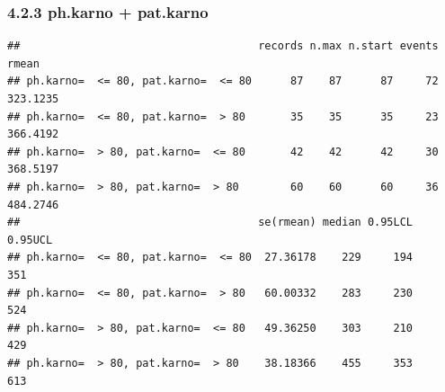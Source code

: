 \documentclass[
]{article}
\newenvironment{Shaded}{\begin{snugshade}}{\end{snugshade}}
\newcommand{\AttributeTok}[1]{\textcolor[rgb]{0.77,0.63,0.00}{#1}}
\newcommand{\CommentTok}[1]{\textcolor[rgb]{0.56,0.35,0.01}{\textit{#1}}}
\newcommand{\DecValTok}[1]{\textcolor[rgb]{0.00,0.00,0.81}{#1}}
\newcommand{\FunctionTok}[1]{\textcolor[rgb]{0.00,0.00,0.00}{#1}}
\newcommand{\NormalTok}[1]{#1}
\newcommand{\OtherTok}[1]{\textcolor[rgb]{0.56,0.35,0.01}{#1}}
\newcommand{\SpecialCharTok}[1]{\textcolor[rgb]{0.00,0.00,0.00}{#1}}
\newcommand{\StringTok}[1]{\textcolor[rgb]{0.31,0.60,0.02}{#1}}
\begin{document}
\hypertarget{ph.karno-pat.karno}{%
\subsubsection{4.2.3 ph.karno + pat.karno}\label{ph.karno-pat.karno}}

\begin{Shaded}
\end{Shaded}

\begin{verbatim}
##                                     records n.max n.start events    rmean
## ph.karno=  <= 80, pat.karno=  <= 80      87    87      87     72 323.1235
## ph.karno=  <= 80, pat.karno=  > 80       35    35      35     23 366.4192
## ph.karno=  > 80, pat.karno=  <= 80       42    42      42     30 368.5197
## ph.karno=  > 80, pat.karno=  > 80        60    60      60     36 484.2746
##                                     se(rmean) median 0.95LCL 0.95UCL
## ph.karno=  <= 80, pat.karno=  <= 80  27.36178    229     194     351
## ph.karno=  <= 80, pat.karno=  > 80   60.00332    283     230     524
## ph.karno=  > 80, pat.karno=  <= 80   49.36250    303     210     429
## ph.karno=  > 80, pat.karno=  > 80    38.18366    455     353     613
\end{verbatim}
\end{document}
